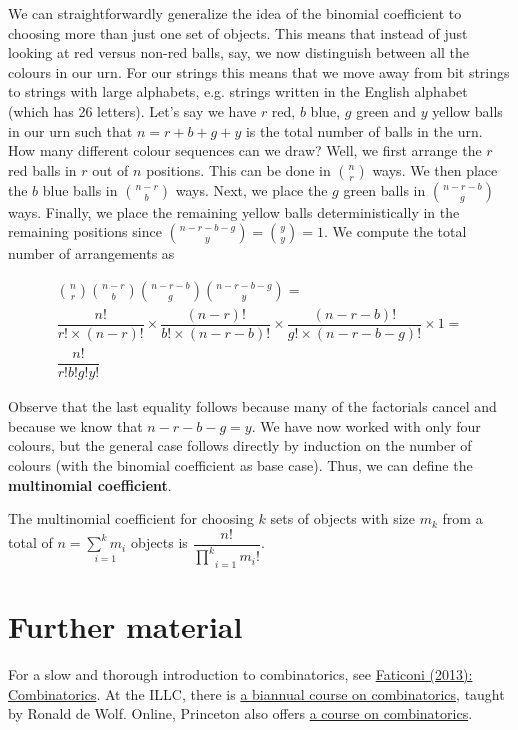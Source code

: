 We can straightforwardly generalize the idea of the binomial coefficient to choosing more than just one set of objects. This means that instead of just
looking at red versus non-red balls, say, we now distinguish between all the colours in our urn. For our strings this means that we move away from
bit strings to strings with large alphabets, e.g. strings written in the English alphabet (which has 26 letters). Let's say we have $ r $ red, 
$ b $ blue, $ g $ green and $ y $ yellow balls in our urn such that $ n = r+b+g+y $ is the total number of balls in the urn. How many different
colour sequences can we draw? Well, we first arrange the $ r $ red balls in $ r $ out of $ n $ positions. This can be done in 
$ \binom{n}{r} $ ways. We then place the $ b $ blue balls in $ \binom{n-r}{b} $ ways. Next, we place the $ g $ green balls in $ \binom{n-r-b}{g} $
ways. Finally, we place the remaining yellow balls deterministically in the remaining positions since $ \binom{n-r-b-g}{y} = \binom{y}{y} = 1  $.
We compute the total number of arrangements as

\begin{gather}
\binom{n}{r} \binom{n-r}{b} \binom{n-r-b}{g} \binom{n-r-b-g}{y} = \\
\dfrac{n!}{r!\times (n-r)!} \times \dfrac{(n-r)!}{b!\times (n-r-b)!} \times \dfrac{(n-r-b)!}{g! \times (n-r-b-g)!} \times 1 = \\
\dfrac{n!}{r!b!g!y!}
\end{gather}

Observe that the last equality follows because many of the factorials cancel and because we know that $ n-r-b-g = y $. We have now worked with
only four colours, but the general case follows directly by induction on the number of colours (with the binomial coefficient as base case). 
Thus, we can define the \textbf{multinomial coefficient}.

\begin{Definition}
The multinomial coefficient for choosing $ k $ sets of objects with size $ m_{k} $ from a total of $ n = \underset{i=1}{\overset{k}{\sum}m_{i}} $ 
objects is $ \dfrac{n!}{\underset{i=1}{\overset{k}{\prod}}m_{i}!} $.
\end{Definition}

\section*{Further material}
For a slow and thorough introduction to combinatorics, see \href{http://eu.wiley.com/WileyCDA/WileyTitle/productCd-111840436X.html}{Faticoni (2013): 
Combinatorics}. At the ILLC, there is \href{http://homepages.cwi.nl/~rdewolf/combinatorics14.html}{a biannual course on combinatorics}, 
taught by Ronald de Wolf. Online, Princeton also offers \href{https://www.coursera.org/course/ac}{a course on combinatorics}.
